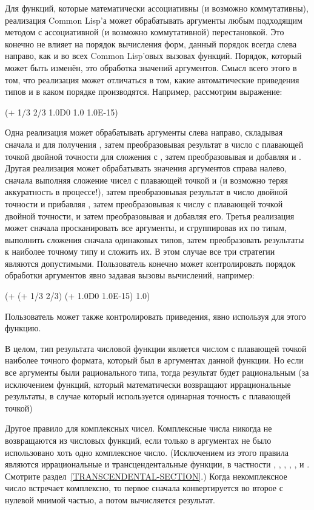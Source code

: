 Для функций, которые математически ассоциативны (и возможно коммутативны),
реализация Common Lisp'а может обрабатывать аргументы любым подходящим методом с
ассоциативной (и возможно коммутативной) перестановкой.
Это конечно не влияет на порядок вычисления форм, данный порядок всегда слева
направо, как и во всех Common Lisp'овых вызовах функций. Порядок, который может
быть изменён, это обработка значений аргументов.
Смысл всего этого в том, что реализация может отличаться в том, какие
автоматические приведения типов и в каком порядке производятся. Например,
рассмотрим выражение:
\begin{lisp}
(+ 1/3 2/3 1.0D0 1.0 1.0E-15)
\end{lisp}
Одна реализация может обрабатывать аргументы слева направо, складывая сначала
 и  для получения , затем преобразовывая результат в число
с плавающей точкой двойной точности для сложения с , затем
преобразовывая и добавляя  и . Другая реализация может
обрабатывать значения аргументов справа налево, сначала выполняя сложение чисел
с плавающей точкой  и  (и возможно теряя аккуратность в
процессе!), затем преобразовывая результат в число двойной точности и прибавляя
, затем преобразовывая  к числу с плавающей точкой двойной
точности, и затем преобразовывая  и добавляя его.
Третья реализация может сначала просканировать все аргументы, и сгруппировав их
по типам, выполнить сложения сначала одинаковых типов, затем преобразовать
результаты к наиболее точному типу и сложить их. В этом случае все три стратегии
являются допустимыми. Пользователь конечно может контролировать порядок
обработки аргументов явно задавая вызовы вычислений, например:
\begin{lisp}
(+ (+ 1/3 2/3) (+ 1.0D0 1.0E-15) 1.0)
\end{lisp}
Пользователь может также контролировать приведения, явно используя  для этого
функцию.

В целом, тип результата числовой функции является числом с плавающей точкой
наиболее точного формата, который был в аргументах данной функции.
Но если все аргументы были рационального типа, тогда результат будет
рациональным (за исключением функций, который математически возвращают
иррациональные результаты, в случае который используется одинарная точность с
плавающей точкой) 

Другое правило для комплексных чисел.
Комплексные числа никогда не возвращаются из числовых функций, если только в
аргументах не было использовано хоть одно комплексное число. (Исключением из
этого правила являются иррациональные и трансцендентальные функции, в частности
, , , , ,  и
. Смотрите раздел~\ref{TRANSCENDENTAL-SECTION}.)
Когда некомплексное число встречает комплексно, то первое сначала конвертируется
во второе с нулевой мнимой частью, а потом вычисляется результат.

